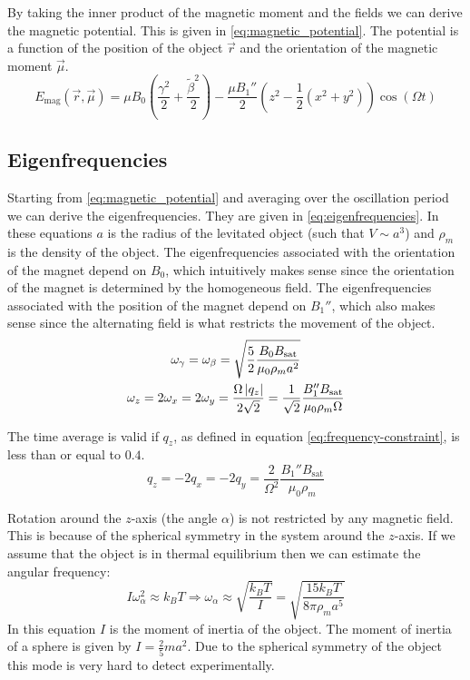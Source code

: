 By taking the inner product of the magnetic moment and the fields we can derive the magnetic potential. This is given in \autoref{eq:magnetic_potential}. The potential is a function of the position of the object $\vec{r}$ and the orientation of the magnetic moment $\vec{\mu}$\cite{perdriat}.
\begin{equation}
    E_\text{mag}(\vec{r}, \vec{\mu}) = \mu B_0 \left(\frac{\gamma^2}{2} + \frac{\tilde\beta^2}{2}\right) - \frac{\mu B_1''}{2} \left(z^2 - \frac{1}{2}\left(x^2 + y^2\right)\right)\cos(\Omega t)
    \label{eq:magnetic_potential}
\end{equation}

\subsection{Eigenfrequencies}
\label{subsec:eigenfrequencies}
Starting from \autoref{eq:magnetic_potential} and averaging over the oscillation period we can derive the eigenfrequencies\cite{perdriat}. They are given in \autoref{eq:eigenfrequencies}. In these equations $a$ is the radius of the levitated object (such that $V \sim a^3$) and $\rho_m$ is the density of the object. The eigenfrequencies associated with the orientation of the magnet depend on $B_0$, which intuitively makes sense since the orientation of the magnet is determined by the homogeneous field. The eigenfrequencies associated with the position of the magnet depend on $B_1''$, which also makes sense since the alternating field is what restricts the movement of the object.
\begin{equation}
    \begin{gathered}
        \omega_\gamma = \omega_{\beta} = \sqrt{\frac{5}{2}\frac{B_0B_\text{sat}}{\mu_0 \rho_m a^2}} \\
        \omega_z = 2\omega_x = 2\omega_y = \frac{\Omega \left\lvert q_z\right\rvert}{2\sqrt{2}} = \frac{1}{\sqrt{2}}\frac{B_1''B_\text{sat}}{\mu_0\rho_m\Omega}
    \end{gathered}
    \label{eq:eigenfrequencies}
\end{equation}

The time average is valid if $q_z$, as defined in equation \ref{eq:frequency-constraint}, is less than or equal to $0.4$\cite{perdriat}.
\begin{equation}
    q_z = -2q_x = -2q_y = \frac{2}{\Omega^2}\frac{B_1''B_{\text{sat}}}{\mu_0\rho_m}
    \label{eq:frequency-constraint}
\end{equation}

Rotation around the $z$-axis (the angle $\alpha$) is not restricted by any magnetic field. This is because of the spherical symmetry in the system around the $z$-axis. If we assume that the object is in thermal equilibrium then we can estimate the angular frequency:
\begin{equation}
    I\omega_\alpha^2 \approx k_B T \Rightarrow \omega_\alpha \approx \sqrt{\frac{k_B T}{I}} = \sqrt{\frac{15 k_B T}{8 \pi \rho_m a^5}}
\end{equation}
In this equation $I$ is the moment of inertia of the object. The moment of inertia of a sphere is given by $I = \frac{2}{5} m a^2$. Due to the spherical symmetry of the object this mode is very hard to detect experimentally.

